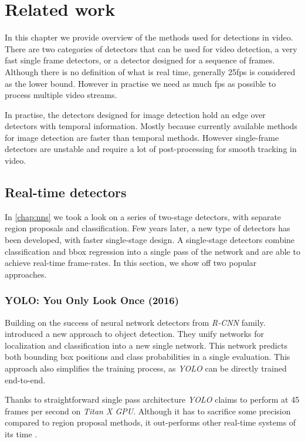 \chapter{Related work}
\label{chap:related}

In this chapter we provide overview of the methods used for detections in video. There are two categories of detectors that can be used for video detection, a very fast single frame detectors, or a detector designed for a sequence of frames. Although there is no definition of what is real time, generally 25fps is considered as the lower bound. However in practise we need as much fps as possible to process multiple video streams. 

In practise, the detectors designed for image detection hold an edge over detectors with temporal information. Mostly because currently available methods for image detection are faster than temporal methods. However single-frame detectors are unstable and require a lot of post-processing for smooth tracking in video. 

\section{Real-time detectors}
In \cref{chap:nns} we took a look on a series of two-stage detectors, with separate region proposals and classification. Few years later, a new type of detectors has been developed, with faster single-stage design. A single-stage detectors combine classification and bbox regression into a single pass of the network and are able to achieve real-time frame-rates. In this section, we show off two popular approaches.

\subsection{YOLO: You Only Look Once (2016)}
\label{sec:yolo}
Building on the success of neural network detectors from \textit{R-CNN} family. \citeauthor{bib:yolo} \cite{bib:yolo} introduced a new approach to object detection. They unify networks for localization and classification into a new single network. This network predicts both bounding box positions and class probabilities in a single evaluation. This approach also simplifies the training process, as \textit{YOLO} can be directly trained end-to-end. 

Thanks to straightforward single pass architecture \textit{YOLO} claims to perform at 45 frames per second on \textit{Titan X GPU}. Although it has to sacrifice some precision compared to region proposal methods, it out-performs other real-time systems of its time \cite{bib:overfeat}.


